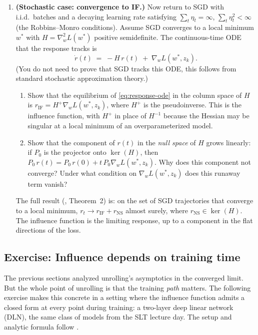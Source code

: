 \documentclass[11pt]{article}
\begin{document}
\begin{exercise}
\begin{enumerate}
  Take $K\to\infty$ (assuming $\eta < 2/\lambda_{\max}(H)$) and recover the influence function $r_\infty = -H^{-1}\nabla_w L(w^*,z_k) = r_{\mathrm{IF}}$.

  \item \textbf{(Stochastic case: convergence to IF.)} Now return to SGD with i.i.d.\ batches and a decaying learning rate satisfying $\sum_t \eta_t = \infty$, $\sum_t \eta_t^2 < \infty$ (the Robbins--Monro conditions). Assume SGD converges to a local minimum $w^*$ with $H = \nabla_w^2 L(w^*)$ positive semidefinite. The continuous-time ODE that the response tracks is
  \begin{equation}\label{eq:response-ode}
    \dot{r}(t) \;=\; -H\,r(t) \;+\; \nabla_w L(w^*,z_k).
  \end{equation}
  (You do not need to prove that SGD tracks this ODE, this follows from standard stochastic approximation theory.)
  \begin{enumerate}
    \item[i.] Show that the equilibrium of \eqref{eq:response-ode} in the column space of $H$ is $r_{\mathrm{IF}} = H^+\nabla_w L(w^*,z_k)$, where $H^+$ is the pseudoinverse. This is the influence function, with $H^+$ in place of $H^{-1}$ because the Hessian may be singular at a local minimum of an overparameterized model.
    \item[ii.] Show that the component of $r(t)$ in the \emph{null space} of $H$ grows linearly: if $P_0$ is the projector onto $\ker(H)$, then $P_0\,r(t) = P_0\,r(0) + t\,P_0\nabla_w L(w^*,z_k)$. Why does this component not converge? Under what condition on $\nabla_w L(w^*,z_k)$ does this runaway term vanish?
  \end{enumerate}

  The full result (\citet{mlodozeniec2025distributional}, Theorem~2) is: on the set of SGD trajectories that converge to a local minimum, $r_t \to r_{\mathrm{IF}} + r_{\mathrm{NS}}$ almost surely, where $r_{\mathrm{NS}} \in \ker(H)$. The influence function is the limiting response, up to a component in the flat directions of the loss.
\end{enumerate}
\end{exercise}


\subsection{Exercise: Influence depends on training time}\label{subsec:dln-exercise}

The previous sections analyzed unrolling's asymptotics in the converged limit. But the whole point of unrolling is that the training \emph{path} matters. The following exercise makes this concrete in a setting where the influence function admits a closed form at every point during training: a two-layer deep linear network (DLN), the same class of models from the SLT lecture day. The setup and analytic formula follow \citet{lee2025stagewise}.
\end{document}
